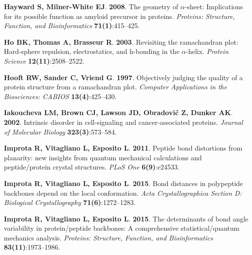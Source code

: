 \documentclass[fleqn,10pt,lineno]{wlpeerj} %
\begin{document}
\begin{thebibliography}{60}
\textbf{Hayward S, Milner-White EJ}. \textbf{2008}.
\newblock The geometry of $\alpha$-sheet: Implications for its possible
  function as amyloid precursor in proteins.
\newblock \emph{Proteins: Structure, Function, and Bioinformatics}
  \textbf{71(1)}:415--425.

\textbf{Ho BK, Thomas A, Brasseur R}. \textbf{2003}.
\newblock Revisiting the ramachandran plot: Hard-sphere repulsion,
  electrostatics, and h-bonding in the $\alpha$-helix.
\newblock \emph{Protein Science} \textbf{12(11)}:2508--2522.

\textbf{Hooft RW, Sander C, Vriend G}. \textbf{1997}.
\newblock Objectively judging the quality of a protein structure from a
  ramachandran plot.
\newblock \emph{Computer Applications in the Biosciences: CABIOS}
  \textbf{13(4)}:425--430.

\textbf{Iakoucheva LM, Brown CJ, Lawson JD, Obradovi{\'c} Z, Dunker AK}.
  \textbf{2002}.
\newblock Intrinsic disorder in cell-signaling and cancer-associated proteins.
\newblock \emph{Journal of Molecular Biology} \textbf{323(3)}:573--584.

\textbf{Improta R, Vitagliano L, Esposito L}. \textbf{2011}.
\newblock Peptide bond distortions from planarity: new insights from quantum
  mechanical calculations and peptide/protein crystal structures.
\newblock \emph{PLoS One} \textbf{6(9)}:e24533.

\textbf{Improta R, Vitagliano L, Esposito L}. \textbf{2015}{}.
\newblock Bond distances in polypeptide backbones depend on the local
  conformation.
\newblock \emph{Acta Crystallographica Section D: Biological Crystallography}
  \textbf{71(6)}:1272--1283.

\textbf{Improta R, Vitagliano L, Esposito L}. \textbf{2015}{}.
\newblock The determinants of bond angle variability in protein/peptide
  backbones: A comprehensive statistical/quantum mechanics analysis.
\newblock \emph{Proteins: Structure, Function, and Bioinformatics}
  \textbf{83(11)}:1973--1986.


\end{thebibliography}
\end{document}
